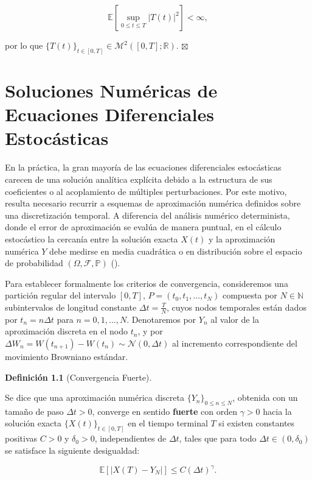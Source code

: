\documentclass[
  spanish,
  letterpaper,
  DIV=11,
  numbers=noendperiod]{scrreprt}
\theoremstyle{plain}
\theoremstyle{plain}
\theoremstyle{plain}
\theoremstyle{definition}
\newtheorem{definition}{Definición}[chapter]
\theoremstyle{remark}
\begin{document}
\[
\mathbb{E}\left[ \sup_{0 \le t \le T} \vert T(t) \vert^2 \right] < \infty,
\]

por lo que
\(\{T(t)\}_{t \in [0, T]} \in \mathcal{M}^2([0, T]; \mathbb{R})\).
\(\boxtimes\)

\chapter{Soluciones Numéricas de Ecuaciones Diferenciales
Estocásticas}\label{sec-numerico}

En la práctica, la gran mayoría de las ecuaciones diferenciales
estocásticas carecen de una solución analítica explícita debido a la
estructura de sus coeficientes o al acoplamiento de múltiples
perturbaciones. Por este motivo, resulta necesario recurrir a esquemas
de aproximación numérica definidos sobre una discretización temporal. A
diferencia del análisis numérico determinista, donde el error de
aproximación se evalúa de manera puntual, en el cálculo estocástico la
cercanía entre la solución exacta \(X(t)\) y la aproximación numérica
\(Y\) debe medirse en media cuadrática o en distribución sobre el
espacio de probabilidad \((\Omega, \mathcal{F}, \mathbb{P})\)
().

Para establecer formalmente los criterios de convergencia, consideremos
una partición regular del intervalo \([0, T]\),
\(P = (t_0, t_1, \dots, t_N)\) compuesta por \(N \in \mathbb{N}\)
subintervalos de longitud constante \(\Delta t = \frac{T}{N}\), cuyos
nodos temporales están dados por \(t_n = n \Delta t\) para
\(n = 0, 1, \dots, N\). Denotaremos por \(Y_n\) al valor de la
aproximación discreta en el nodo \(t_n\), y por
\(\Delta W_n = W(t_{n+1}) - W(t_n) \sim \mathcal{N}(0, \Delta t)\) al
incremento correspondiente del movimiento Browniano estándar.

\begin{definition}[Convergencia
Fuerte]\protect\hypertarget{def-convergencia-fuerte}{}\label{def-convergencia-fuerte}

Se dice que una aproximación numérica discreta
\(\{Y_n\}_{0 \le n \le N}\), obtenida con un tamaño de paso
\(\Delta t > 0\), converge en sentido \textbf{fuerte} con orden
\(\gamma > 0\) hacia la solución exacta \(\{X(t)\}_{t \in [0, T]}\) en
el tiempo terminal \(T\) si existen constantes positivas \(C > 0\) y
\(\delta_0 > 0\), independientes de \(\Delta t\), tales que para todo
\(\Delta t \in (0, \delta_0)\) se satisface la siguiente desigualdad:

\[
\mathbb{E}\left[ \vert X(T) - Y_N \vert \right] \le C (\Delta t)^\gamma.
\]

\end{definition}
\end{document}
